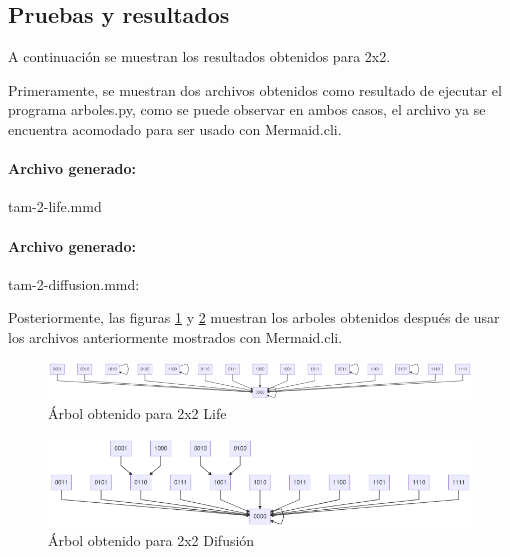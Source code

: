 \subsection{Pruebas y resultados}
	A continuación se muestran los resultados obtenidos para 2x2.


	Primeramente, se muestran dos archivos obtenidos como resultado de ejecutar el programa arboles.py, como se puede observar en ambos casos, el archivo ya se encuentra acomodado para ser usado con Mermaid.cli.


	\paragraph{Archivo generado:} tam-2-life.mmd
	
	
	\paragraph{Archivo generado:} tam-2-diffusion.mmd:
	

	Posteriormente, las figuras \ref{fig:graf1} y \ref{fig:graf2} muestran los arboles obtenidos después de usar los archivos anteriormente mostrados con Mermaid.cli.

	\begin{figure}[H]
		\begin{center}
			\includegraphics[scale=.5]{Grafos/img/tam-2-life.png}
			\caption{Árbol obtenido para 2x2 Life}
			\label{fig:graf1}
		\end{center}
	\end{figure}

	\begin{figure}[H]
		\begin{center}
			\includegraphics[scale=.5]{Grafos/img/tam-2-diffusion.png}
			\caption{Árbol obtenido para 2x2 Difusión}
			\label{fig:graf2}
		\end{center}
	\end{figure}